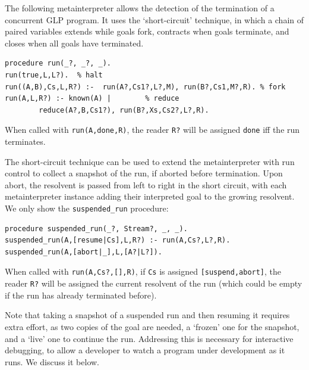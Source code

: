  The following metainterpreter allows the detection of the termination of a concurrent GLP program.  It uses the `short-circuit' technique, in which a chain of paired variables extends while goals fork, contracts when goals terminate, and closes when all goals have terminated.

\label{program:meta-termination}
\begin{small}
\begin{verbatim}
procedure run(_?, _?, _).
run(true,L,L?).  % halt
run((A,B),Cs,L,R?) :-  run(A?,Cs1?,L?,M), run(B?,Cs1,M?,R). % fork
run(A,L,R?) :- known(A) |        % reduce
        reduce(A?,B,Cs1?), run(B?,Xs,Cs2?,L?,R).
\end{verbatim}
\end{small}

When called with \verb|run(A,done,R)|, the reader \verb|R?| will be assigned \verb|done| iff the run terminates.  


The short-circuit technique can be used to extend the metainterpreter with run control to collect a snapshot of the run, if aborted before termination.  Upon abort,  
the resolvent is passed from left to right in the short circuit, with each metainterpreter instance adding their interpreted goal to the growing resolvent.
We only show the \verb|suspended_run| procedure:

\label{program:meta-control-abort-snapshot}
\begin{small}
\begin{verbatim}
procedure suspended_run(_?, Stream?, _, _).
suspended_run(A,[resume|Cs],L,R?) :- run(A,Cs?,L?,R).
suspended_run(A,[abort|_],L,[A?|L?]).
\end{verbatim}
\end{small}

When called with \verb|run(A,Cs?,[],R)|, if \verb|Cs| is assigned \verb|[suspend,abort]|, the reader \verb|R?| will be assigned the current resolvent of the run (which could be empty if the run has already terminated before).

Note that taking a snapshot of a suspended run and then resuming it requires extra effort, as two copies of the goal are needed,  a `frozen' one for the snapshot, and a `live' one to continue the run.  Addressing this is necessary for interactive debugging, to allow a developer to watch a program under development as it runs.  We discuss it below.


